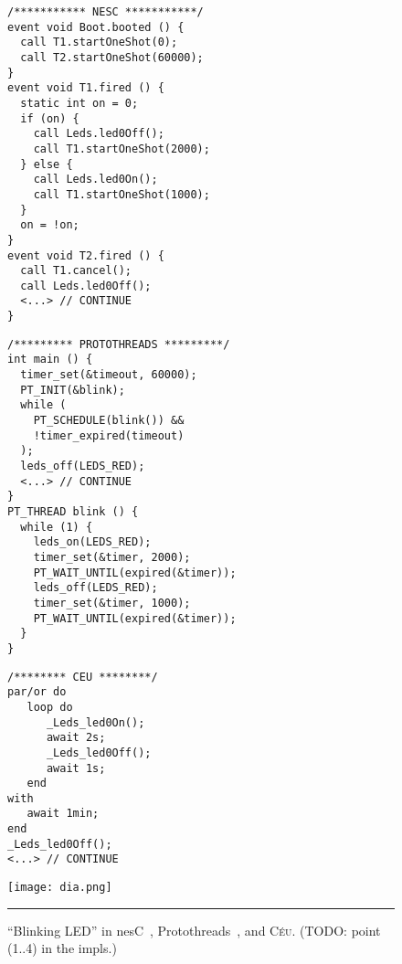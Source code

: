 \documentclass[10pt]{sensys-proc}
\newcommand{\CEU}{\textsc{C\'{e}u}\xspace}
\begin{document}
\begin{figure*}[!t]
\begin{minipage}[t]{0.24\linewidth}
{\small
\begin{verbatim}
/*********** NESC ***********/
event void Boot.booted () {
  call T1.startOneShot(0);
  call T2.startOneShot(60000);
}
event void T1.fired () {
  static int on = 0;
  if (on) {
    call Leds.led0Off();
    call T1.startOneShot(2000);
  } else {
    call Leds.led0On();
    call T1.startOneShot(1000);
  }
  on = !on;
}
event void T2.fired () {
  call T1.cancel();
  call Leds.led0Off();
  <...> // CONTINUE
}
\end{verbatim}
}
\end{minipage}
%
\hfill \vrule \hfill
\hspace{0.0cm}
%
\begin{minipage}[t]{0.28\linewidth}
{\small
\begin{verbatim}
/********* PROTOTHREADS *********/
int main () {
  timer_set(&timeout, 60000);
  PT_INIT(&blink);
  while (
    PT_SCHEDULE(blink()) &&
    !timer_expired(timeout)
  );
  leds_off(LEDS_RED);
  <...> // CONTINUE
}
PT_THREAD blink () {
  while (1) {
    leds_on(LEDS_RED);
    timer_set(&timer, 2000);
    PT_WAIT_UNTIL(expired(&timer));
    leds_off(LEDS_RED);
    timer_set(&timer, 1000);
    PT_WAIT_UNTIL(expired(&timer));
  }
}
\end{verbatim}
}
\end{minipage}
%
\hfill \vrule \hfill
\hspace{0.0cm}
%
\begin{minipage}[t]{0.18\linewidth}
{\small
\begin{verbatim}
/******** CEU ********/
par/or do
   loop do
      _Leds_led0On();
      await 2s;
      _Leds_led0Off();
      await 1s;
   end
with
   await 1min;
end
_Leds_led0Off();
<...> // CONTINUE
\end{verbatim}
}
\end{minipage}
%
\hfill \vrule \hfill
\hspace{0.0cm}
%
\begin{minipage}[t]{0.15\linewidth}
\vspace{0pt}
\centering
\texttt{[image: dia.png]}
\end{minipage}
%
\hspace{0.0cm}
%
\rule{18cm}{0.37pt}
\caption{ ``Blinking LED'' in
    nesC~\cite{wsn.nesc},
    Protothreads~\cite{wsn.protothreads},
    and \CEU.
    (TODO: point (1..4) in the impls.)
\label{lst.all}
}
\end{figure*}
\end{document}
